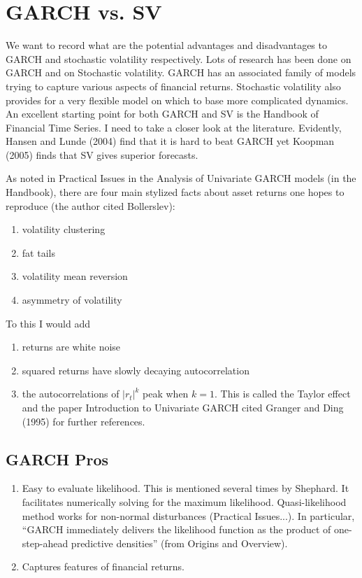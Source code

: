 \documentclass{article}
\begin{document}
\section{GARCH vs. SV}

We want to record what are the potential advantages and disadvantages to GARCH and stochastic volatility respectively.  Lots of research has been done on GARCH and on Stochastic volatility.  GARCH has an associated family of models trying to capture various aspects of financial returns.  Stochastic volatility also provides for a very flexible model on which to base more complicated dynamics.  An excellent starting point for both GARCH and SV is the Handbook of Financial Time Series.  I need to take a closer look at the literature.  Evidently, Hansen and Lunde (2004) find that it is hard to beat GARCH yet Koopman (2005) finds that SV gives superior forecasts.

As noted in Practical Issues in the Analysis of Univariate GARCH models (in the Handbook), there are four main stylized facts about asset returns one hopes to reproduce (the author cited Bollerslev):
\begin{enumerate}
\item volatility clustering
\item fat tails
\item volatility mean reversion
\item asymmetry of volatility
\end{enumerate}
To this I would add
\begin{enumerate}
\item returns are white noise
\item squared returns have slowly decaying autocorrelation
\item the autocorrelations of $|r_t|^k$ peak when $k=1$.  This is called the Taylor effect and the paper Introduction to Univariate GARCH cited Granger and Ding (1995) for further references.
\end{enumerate}

\subsection{GARCH Pros}
\begin{enumerate}
\item Easy to evaluate likelihood.  This is mentioned several times by Shephard.  It facilitates numerically solving for the maximum likelihood.  Quasi-likelihood method works for non-normal disturbances (Practical Issues...).  In particular, ``GARCH immediately delivers the likelihood function as the product of one-step-ahead predictive densities'' (from Origins and Overview).
\item Captures features of financial returns.
\end{enumerate}
\end{document}
